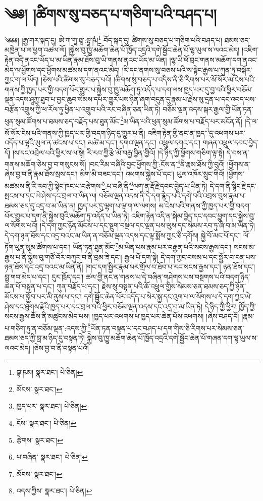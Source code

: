 \setcounter{footnote}{0} 
\chapter{༄༅། །ཚིགས་སུ་བཅད་པ་གཅིག་པའི་བཤད་པ།}༄༅༅། །རྒྱ་གར་སྐད་དུ། ཨེ་ཀ་གཱ་ཐཱ་:བྷཱ་ཥཾ།\footnote{བྷ་ཥམ།  སྣར་ཐང་།  པེ་ཅིན། } བོད་སྐད་དུ། ཚིགས་སུ་བཅད་པ་གཅིག་པའི་བཤད་པ། ཐམས་ཅད་མཁྱེན་པ་ལ་ཕྱག་འཚལ་ལོ། །སྐྱེས་བུ་ཁྱུ་མཆོག་ཆེན་པོ་ཁྱོད་འདྲའི་དགེ་སྦྱོང་ཆེན་པོ་ལྷ་ཡུལ་ས་ལའང་མེད། །འཇིག་རྟེན་འདི་ནའང་ཡོད་པ་མ་ཡིན་རྣམ་ཐོས་བུ་ཡི་གནས་ནའང་ཡོད་མ་ཡིན། །ལྷ་ཡི་ཕོ་བྲང་གནས་མཆོག་དག་ནའང་མེད་ལ་ཕྱོགས་དང་ཕྱོགས་མཚམས་དག་ནའང་མེད། །རི་དང་ནགས་སུ་བཅས་པའི་ས་སྟེང་རྒྱས་པ་ཀུན་ཏུ་བསྐོར་ཀྱང་ག་ལ་ཡོད། །ཅེས་པའི་ཚིགས་སུ་བཅད་པའོ། །ཚིགས་སུ་བཅད་པ་འདིས་ནི་ཅི་རིགས་པར་སོ་སོར་མ་ངེས་པའི་གནས་ཀྱི་ཁྱད་པར་གྱི་བདག་པོར་གྱུར་པ་སྐྱེས་བུ་ཁྱུ་མཆོག་ཏུ་འདོད་པ་དག་ལས་ཁྱད་པར་དུ་བྱ་བའི་ཕྱིར་བཅོམ་ལྡན་འདས་ཤཱཀྱ་ཐུབ་པ་བྱང་ཆུབ་སེམས་དཔར་གྱུར་པས་ཉིན་ཞག་བདུན་དུ་རྣམ་པ་རྗེས་སུ་དྲན་པ་དང་འབད་པས་བརྩོན་འགྲུས་ཀྱི་ཕ་རོལ་ཏུ་ཕྱིན་པ་འགྲུབ་པའི་རང་བཞིན་ཅན་ཡིན་ཏེ། བཅོམ་ལྡན་འདས་སྐར་རྒྱལ་གྱི་ཡོན་ཏན་ཕུན་སུམ་ཚོགས་པ་ཐམས་ཅད་བརྗོད་པས་ཐུན་མོང་\footnote{མོངས་  སྣར་ཐང་། }མ་ཡིན་པའི་ཕུན་སུམ་ཚོགས་པ་བརྗོད་པར་མངོན་ནོ། །དེ་ལ་སོ་སོར་ངེས་པའི་གནས་ཀྱི་ཁྱད་པར་གྱི་བདག་ཉིད་དུ་གྱུར་པ་ནི། འཇིག་རྟེན་གྱི་ནང་ན་ཁྱད་\footnote{ཁྱད་པར་  སྣར་ཐང་།  པེ་ཅིན། }དུ་འཕགས་པར་འདོད་པ་ལྷའི་ཡུལ་ན་ཚངས་པ་དང་། མཚེ་མ་དང་། དགའ་ལྡན་དང་། འཕྲུལ་དགའ་དང་། གཞན་འཕྲུལ་དབང་བྱེད་དོ། །ས་དང་འབྲེལ་པའི་ཕྱིར་ས་ལ་སྟེ། རི་རབ་ཀྱི་རྩེ་མོ་བརྒྱ་བྱིན་གྱིའོ། །དེ་ཉིད་ཀྱི་ཕྱོགས་གཅིག་ལྟ་སྟེ། དེ་བས་ན་གནས་མཆོག་ཅེས་བྱ་བ་གསུངས་སོ། །བང་རིམ་བཞིའི་བྱང་ཕྱོགས་ཀྱི་:ངོས་ན་\footnote{ངོས་  སྣར་ཐང་།  པེ་ཅིན། }ནི་རྣམ་ཐོས་ཀྱི་བུའོ། །ཕྱོགས་ན་ཞེས་བྱ་བ་ནི་རྣམ་ཐོས་སྲས་དང་། མིག་མི་བཟང་དང་། འཕགས་སྐྱེས་པོ་དང་། ཡུལ་འཁོར་སྲུང་གིའོ། །ཕྱོགས་མཚམས་ནི་རི་རབ་ཀྱི་སྟེང་ཁང་པ་བརྩེགས་\footnote{རྩེགས་  སྣར་ཐང་། }:པ་བཞི་ནི་\footnote{པ་བཞིན་  སྣར་ཐང་།  པེ་ཅིན། }ལག་ན་རྡོ་རྗེ་དབང་བྱེད་པ་ཡིན་ཏེ། དེ་དག་ནི་སྙིང་རྗེ་དང་སྤངས་པ་དང་ཡེ་ཤེས་དང་བྲལ་བ་ཡིན་ལ། བཅོམ་ལྡན་འདས་ནི་དེ་དག་རྙེད་པའི་དགེ་བའི་འབྲས་བུས་རྣམ་པ་ཐམས་ཅད་དུ་འདྲ་བ་མ་ཡིན་ན། ཁྱད་པར་དུ་ལྷག་པ་ལྟ་ག་ལ་ལགས། མ་ངེས་པའི་གནས་ཀྱི་ཁྱད་པར་གྱི་བདག་པོར་གྱུར་པ་དག་ནི་སྐྱེས་བུའི་མཆོག་ཏུ་འདོད་པ་ཡིན་ཏེ། འཇིག་རྟེན་འདི་ན་སྐེམ་བྱེད་དང་དབང་ཕྱུག་དང་སྐྱེས་བུ་ལ་སོགས་པའོ། །དེ་དག་ཀྱང་ཉོན་མོངས་པ་དང་སྡུག་བསྔལ་དང་ལྡན་པས་ལུས་དང་སེམས་རབ་ཏུ་ཞི་བ་མ་ཡིན་ཏེ། དེ་དག་ཉན་ཐོས་དང་འདྲ་བའང་མ་ཡིན་ན་བཅོམ་ལྡན་འདས་དང་ལྟ་སྨོས་ཀྱང་ཅི་དགོས། སྐྱེ་བོ་མང་པོ་དང་། ལོ་ཏོག་ཕུན་སུམ་ཚོགས་པ་དང་། ཡོན་ཏན་ཐུན་མོང་\footnote{མོངས་  སྣར་ཐང་། }མ་ཡིན་པས་རྣམ་པར་བརྒྱན་པའི་སངས་རྒྱས་དང་། སངས་མ་རྒྱས་པ་ནི་སྐྱེས་བུ་གཙོ་བོར་བཀུར་བ་ནི་བྲམ་ཟེ་དང་། རྒྱལ་པོ་དག་སྟེ། དེ་དག་ཀྱང་བསམ་པ་དང་སྦྱོར་བ་ངན་པས་ཉན་ཐོས་དང་འདྲ་བའང་མ་ཡིན་ནོ། །གང་དག་སྤྱིར་རྣམ་པར་གྲོལ་བ་ཐོབ་པ་རང་སངས་རྒྱས་དང་། ཉན་ཐོས་དང་། བླ་གབ་མེད་པ་དང་། དུར་ཁྲོད་དང་། ཚལ་གྱི་ནང་ན་གནས་པ་དེ་བཞིན་གཤེགས་པས་བསྔགས་པའི་བདག་ཉིད་ཆེན་པོ་བསྟན་པ་དང་། ཀུན་བརྗོད་པ་དང་། རྗེས་སུ་བསྟན་པའི་ཆོ་འཕྲུལ་གྱིས་སེམས་ཅན་ཐམས་ཅད་ཀྱི་ཉོན་མོངས་པ་སྐྱོབ་པར་མི་ནུས་པ་དང་། དགེ་སྦྱོང་ཆེན་པོར་འདོད་པ་སེར་སྐྱ་དང་འུག་པ་ལ་སོགས་པ་དེ་དག་ཀྱང་ཡེ་ཤེས་དང་ཐུགས་རྗེའི་ཁྱད་པར་དང་བྲལ་བའི་ཕྱིར་བཅོམ་ལྡན་འདས་དང་འདྲ་བ་མ་ཡིན་ཏེ། དེ་ཉིད་ཀྱི་ཕྱིར། ཁྱོད་ཀྱི་སངས་རྒྱས་ཆོས་ནི་མཚུངས་མེད་པས། །ཁྱད་པར་འཕགས་པ་ཁྱད་པར་ཆེན་པོས་འཕགས། །ཞེས་བཤད་དོ། །རྣམ་པ་གཅིག་ཏུ་ན་བཅོམ་ལྡན་:འདས་ཀྱི་\footnote{འདས་ཀྱིས་  སྣར་ཐང་།  པེ་ཅིན། }ཡོན་ཏན་བསྟན་པ་དང་བཤད་པ་དག་གིས་ཅི་རིགས་པར་སེམས་ཅན་ཐམས་ཅད་ཀྱི་བླ་མ་ཉིད་དུ་བསྟན་ཏེ། སྐྱེས་བུ་ཁྱུ་མཆོག་ཆེན་པོ་ཁྱོད་འདྲའི་དགེ་སྦྱོང་ཆེན་པོ་གཞན་དག་ལྷ་ཡུལ་ས་ལའང་མེད། །ཅེས་བྱ་བ་ནི་བསྟན་པའོ། 